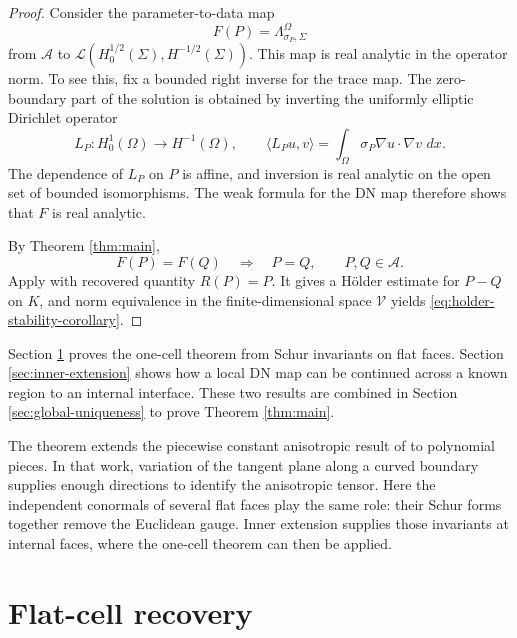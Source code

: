 \documentclass[10pt,a4paper]{amsart}
\newcommand{\dd}{\,d}
\newcommand{\DN}{\Lambda}
\begin{document}
\begin{proof}
Consider the parameter-to-data map
\begin{equation}
  F(P)=\DN^\Omega_{\sigma_P,\Sigma}
\end{equation}
from \(\mathcal A\) to
\(\mathcal L(H^{1/2}_0(\Sigma),H^{-1/2}(\Sigma))\).  This map is real analytic
in the operator norm.  To see this, fix a bounded right inverse for the trace
map.  The zero-boundary part of the solution is obtained by inverting the
uniformly elliptic Dirichlet operator
\begin{equation}
  L_P:H^1_0(\Omega)\to H^{-1}(\Omega),
  \qquad
  \langle L_P u,v\rangle=\int_\Omega \sigma_P\nabla u\cdot\nabla v\,\dd x .
\end{equation}
The dependence of \(L_P\) on \(P\) is affine, and inversion is real analytic on
the open set of bounded isomorphisms.  The weak formula for the DN map therefore
shows that \(F\) is real analytic.

By Theorem \ref{thm:main},
\begin{equation}
  F(P)=F(Q)\quad\Longrightarrow\quad P=Q,
  \qquad P,Q\in\mathcal A .
\end{equation}
Apply \cite[Theorem 3.1]{Carstea2026HolderStability} with recovered quantity
\(R(P)=P\).  It gives a H\"older estimate for \(P-Q\) on \(K\), and norm
equivalence in the finite-dimensional space \(\mathcal V\) yields
\eqref{eq:holder-stability-corollary}.
\end{proof}

Section \ref{sec:flat-cell} proves the one-cell theorem from Schur invariants on
flat faces.  Section \ref{sec:inner-extension} shows how a local DN map can be
continued across a known region to an internal interface.  These two results
are combined in Section \ref{sec:global-uniqueness} to prove Theorem
\ref{thm:main}.

The theorem extends the piecewise constant anisotropic result of
\cite{AlessandriniDeHoopGaburro2017} to polynomial pieces.  In that work,
variation of the tangent plane along a curved boundary supplies enough
directions to identify the anisotropic tensor.  Here the independent conormals
of several flat faces play the same role: their Schur forms together remove the
Euclidean gauge.  Inner extension supplies those invariants at internal faces,
where the one-cell theorem can then be applied.


\section{Flat-cell recovery}
\label{sec:flat-cell}
\end{document}
